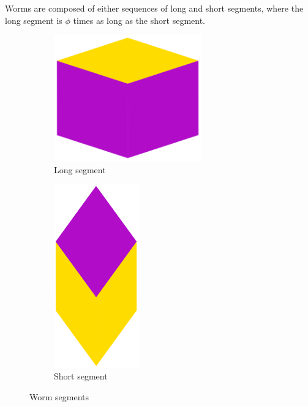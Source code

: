 \documentclass[
  oneside,
  11pt, a4paper,
  footinclude=true,
  headinclude=true,
  cleardoublepage=empty
]{scrbook}
\begin{document}
Worms are composed of either sequences of long and short segments, where the long segment is $\phi$ times as long as the short segment.

\begin{figure}[H]
\centering
\begin{subfigure}[b]{0.4\textwidth}
\centering
\includegraphics[width=0.7\textwidth]{WideWorm}
\caption{Long segment}
\end{subfigure}\hfill
\begin{subfigure}[b]{0.4\textwidth}
\centering
\includegraphics[width=0.4\textwidth]{TallWorm}
\caption{Short segment}
\end{subfigure}
\caption{Worm segments}
\label{fig:wormparts}
\end{figure}
\end{document}
